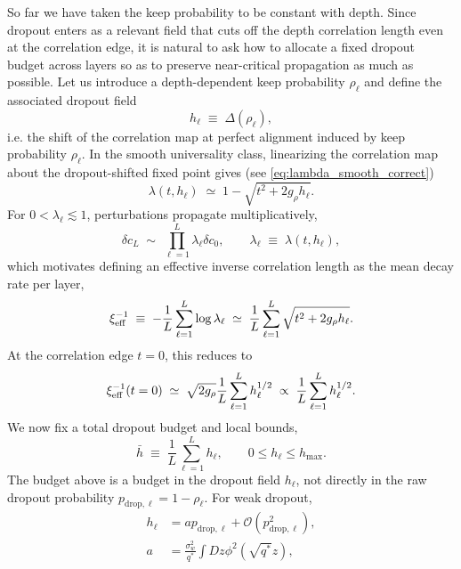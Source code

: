 \documentclass{article}
\theoremstyle{plain}
\theoremstyle{definition}
\theoremstyle{remark}
\begin{document}
So far we have taken the keep probability to be constant with depth. Since dropout enters as a relevant field that cuts off the depth correlation length even at the correlation edge, it is natural to ask how to allocate a fixed dropout budget across layers so as to preserve near-critical propagation as much as possible. Let us introduce a depth-dependent keep probability $\rho_\ell$ and define the associated dropout field
\relax
\begin{equation}
h_\ell \;\equiv\; \Delta(\rho_\ell),
\end{equation}
\relax
i.e. the shift of the correlation map at perfect alignment induced by keep probability $\rho_\ell$. In the smooth universality class, linearizing the correlation map about the dropout-shifted fixed point gives (see \eqref{eq:lambda_smooth_correct})
\relax
\begin{equation}
\lambda(t,h_\ell)\;\simeq\; 1-\sqrt{t^2+2g_\rho h_\ell}.
\end{equation}
\relax
For $0<\lambda_\ell\lesssim 1$, perturbations propagate multiplicatively,
\relax
\begin{equation}
\delta c_L \;\sim\; \prod_{\ell=1}^L \lambda_\ell \delta c_0, \qquad \lambda_\ell \;\equiv\; \lambda(t,h_\ell),
\label{delta_c_dropout_perturb}
\end{equation}
\relax
which motivates defining an effective inverse correlation length as the mean decay rate per layer,
\relax
\begin{equation}
\xi_{\rm eff}^{-1} \;\equiv\; -\frac{1}{L}\sum_{\ell=1}^L \log\lambda_\ell \;\simeq\; \frac{1}{L}\sum_{\ell=1}^L \sqrt{t^2+2g_\rho h_\ell}.
\end{equation}
\relax
At the correlation edge $t=0$, this reduces to
\relax
\begin{equation}
\xi_{\rm eff}^{-1}(t=0) \;\simeq\; \sqrt{2g_\rho} \frac{1}{L}\sum_{\ell=1}^L h_\ell^{1/2} \;\propto\; \frac{1}{L}\sum_{\ell=1}^L h_\ell^{1/2}.
\label{eff_corr}
\end{equation}
\relax
We now fix a total dropout budget and local bounds,
\relax
\begin{equation}
\bar h \;\equiv\; \frac{1}{L}\sum_{\ell=1}^L h_\ell, \qquad 0 \le h_\ell \le h_{\max}.
\end{equation}
\relax
The budget above is a budget in the dropout field \(h_\ell\), not directly in the raw dropout probability \(p_{\mathrm{drop},\ell}=1-\rho_\ell\). For weak dropout,
\relax
\begin{equation}
\begin{aligned}
h_\ell &= a p_{\mathrm{drop},\ell} + \mathcal O(p_{\mathrm{drop},\ell}^2),\\
a&=\frac{\sigma_w^2}{q^\ast}\int Dz \phi^2(\sqrt{q^\ast}z),
\end{aligned}
\end{equation}
\end{document}
